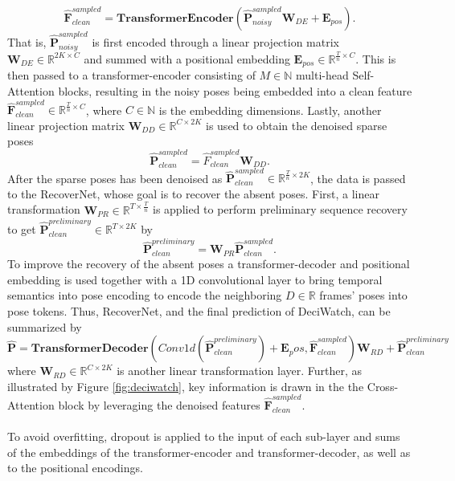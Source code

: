 \documentclass[./main.tex]{subfiles}
\begin{document}
\begin{equation}
    \hat{\bm{F}}_{clean} ^{sampled} = \textbf{TransformerEncoder} \left( \hat{\bm{P}}_{noisy} ^{sampled} \bm{W}_{DE} + \bm{E}_{pos} \right).
\end{equation}
That is, $\hat{\bm{P}}_{noisy} ^{sampled}$ is first encoded through a linear projection matrix $\bm{W}_{DE} \in \mathbb{R}^{2K \times C}$ and summed with a positional embedding $\bm{E}_{pos} \in \mathbb{R}^{\frac{T}{n} \times C}$. This is then passed to a transformer-encoder consisting of $M \in \mathbb{N}$ multi-head Self-Attention blocks, resulting in the noisy poses being embedded into a clean feature $\hat{\bm{F}}_{clean} ^{sampled} \in \mathbb{R}^{\frac{T}{n} \times C}$, where $C \in \mathbb{N}$ is the embedding dimensions. Lastly, another linear projection matrix $\bm{W}_{DD} \in \mathbb{R}^{C \times 2K}$ is used to obtain the denoised sparse poses
\begin{equation}
    \hat{\bm{P}}_{clean} ^{sampled} = \hat{F}_{clean} ^{sampled} \bm{W}_{DD}.
\end{equation}
After the sparse poses has been denoised as $\hat{\bm{P}}_{clean} ^{sampled} \in \mathbb{R}^{\frac{T}{n} \times 2K}$, the data is passed to the RecoverNet, whose goal is to recover the absent poses. First, a linear transformation $\bm{W}_{PR} \in \mathbb{R}^{T \times \frac{T}{n}}$ is applied to perform preliminary sequence recovery to get $\hat{\bm{P}}_{clean} ^{preliminary} \in \mathbb{R}^{T \times 2K}$ by
\begin{equation}
    \hat{\bm{P}}_{clean} ^{preliminary} = \bm{W}_{PR} \hat{\bm{P}}_{clean} ^{sampled}.
\end{equation}
To improve the recovery of the absent poses a transformer-decoder and positional embedding is used together with a 1D convolutional layer to bring temporal semantics into pose encoding to encode the neighboring $D \in \mathbb{R}$ frames' poses into pose tokens. Thus, RecoverNet, and the final prediction of DeciWatch, can be summarized by
\begin{equation}
    \hat{\bm{P}} = \textbf{TransformerDecoder}\left(Conv1d \left( \hat{\bm{P}}_{clean} ^{preliminary} \right) + \bm{E}_pos, \hat{\bm{F}}_{clean} ^{sampled} \right)\bm{W}_{RD} + \hat{\bm{P}}_{clean} ^{preliminary}
\end{equation}
where $\bm{W}_{RD} \in \mathbb{R}^{C \times 2K}$ is another linear transformation layer. Further, as illustrated by Figure \ref{fig:deciwatch}, key information is drawn in the the Cross-Attention block by leveraging the denoised features $\hat{\bm{F}}_{clean} ^{sampled}$.
\\
\\
To avoid overfitting, dropout is applied to the input of each sub-layer and sums of the embeddings of the transformer-encoder and transformer-decoder, as well as to the positional encodings.
\end{document}
